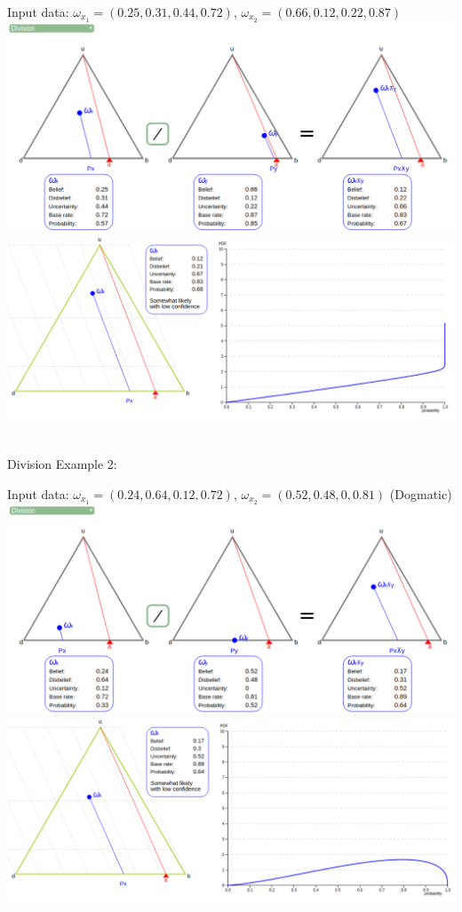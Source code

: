 \documentclass[UTF8]{article}
\newcommand{\opinion}[5]{$\omega_{#1} = (#2, #3, #4, #5)$}
\begin{document}
\begin{center}
    Input data:
    \opinion{x_1}{0.25}{0.31}{0.44}{0.72}, 
    \opinion{x_2}{0.66}{0.12}{0.22}{0.87}\\
    \includegraphics[width=6in]{images/div1.png}
    \includegraphics[width=6in]{images/div1viz.png}
\end{center}
\hrulefill\\
Division Example 2:
    \begin{center}
        Input data: 
        \opinion{x_1}{0.24}{0.64}{0.12}{0.72}, 
        \opinion{x_2}{0.52}{0.48}{0}{0.81} (Dogmatic)
        \includegraphics[width=6in]{images/div2.png}
        \includegraphics[width=6in]{images/div2viz.png}
    \end{center}
\end{document}
